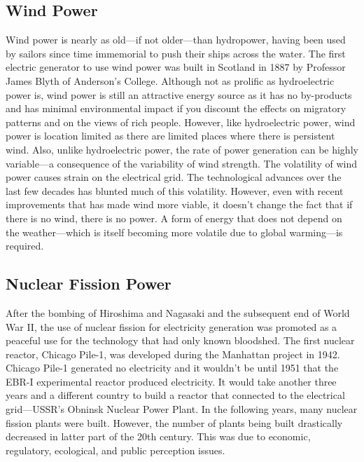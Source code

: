 \subsection{Wind Power}
Wind power is nearly as old---if not older---than hydropower, having been used by sailors since time immemorial to push their ships across the water. The first electric generator to use wind power was built in Scotland in 1887 by Professor James Blyth of Anderson's College\cite{price2005james}. Although not as prolific as hydroelectric power is, wind power is still an attractive energy source as it has no by-products and has minimal environmental impact if you discount the effects on migratory patterns and on the views of rich people\cite{cape_cod_wind}. However, like hydroelectric power, wind power is location limited as there are limited places where there is persistent wind. Also, unlike hydroelectric power, the rate of power generation can be highly variable---a consequence of the variability of wind strength. The volatility of wind power causes strain on the electrical grid. The technological advances over the last few decades has blunted much of this volatility. However, even with recent improvements that has made wind more viable, it doesn't change the fact that if there is no wind, there is no power. A form of energy that does not depend on the weather---which is itself becoming more volatile due to global warming---is required.

\subsection{Nuclear Fission Power}
After the bombing of Hiroshima and Nagasaki and the subsequent end of World War II, the use of nuclear fission for electricity generation was promoted as a peaceful use for the technology that had only known bloodshed. The first nuclear reactor, Chicago Pile-1, was developed during the Manhattan project in 1942. Chicago Pile-1 generated no electricity and it wouldn't be until 1951 that the EBR-I experimental reactor produced electricity\cite{doe_nuclearhistory}. It would take another three years and a different country to build a reactor that connected to the electrical grid---USSR's Obninsk Nuclear Power Plant. In the following years, many nuclear fission plants were built. However, the number of plants being built drastically decreased in latter part of the 20th century. This was due to economic, regulatory, ecological, and public perception issues.

